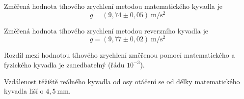 \documentclass[protokol.tex]{subfiles}
\begin{document}
Změřená hodnota tíhového zrychlení metodou matematického kyvadla je $$ g = (9,74 \pm 0,05) \ \si{\metre\per\square\second} $$

Změřená hodnota tíhového zrychlení metodou reverzního kyvadla je $$ g = (9,77 \pm 0,02) \ \si{\metre\per\square\second} $$

Rozdíl mezi hodnotou tíhového zrychlení změřenou pomocí matematického a fyzického kyvadla je zanedbatelný (řádu $10^{-3}$).

Vzdálenost těžiště reálného kyvadla od osy otáčení se od délky matematického kyvadla liší o $4,5 \ \si{\milli\metre}$.
\end{document}
